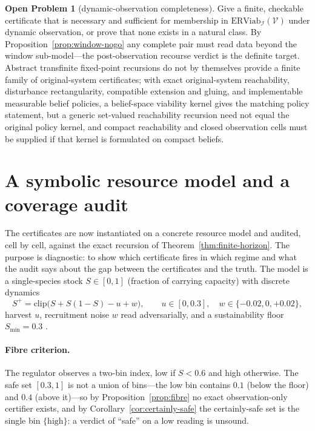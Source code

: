 \documentclass[11pt,a4paper]{article}
\theoremstyle{plain}
\theoremstyle{definition}
\newtheorem{openproblem}[theorem]{Open Problem}
\theoremstyle{remark}
\newcommand{\ERViab}{\mathrm{ERViab}}
\newcommand{\cV}{\mathcal{V}}
\newcommand{\cI}{\mathcal{I}}
\begin{document}
\begin{openproblem}[dynamic-observation completeness]\label{op:dynamic}
Give a finite, checkable certificate that is necessary and sufficient for membership in $\ERViab_\cI(\cV)$ under dynamic observation, or prove that none exists in a natural class. By Proposition~\ref{prop:window-nogo} any complete pair must read data beyond the window sub-model---the post-observation recourse verdict is the definite target. Abstract transfinite fixed-point recursions do not by themselves provide a finite family of original-system certificates; with exact original-system reachability, disturbance rectangularity, compatible extension and gluing, and implementable measurable belief policies, a belief-space viability kernel gives the matching policy statement, but a generic set-valued reachability recursion need not equal the original policy kernel, and compact reachability and closed observation cells must be supplied if that kernel is formulated on compact beliefs.
\end{openproblem}
\section{A symbolic resource model and a coverage audit}\label{sec:casestudy}

The certificates are now instantiated on a concrete resource model and audited, cell by cell, against the exact recursion of Theorem~\ref{thm:finite-horizon}. The purpose is diagnostic: to show which certificate fires in which regime and what the audit says about the gap between the certificates and the truth. The model is a single-species stock $S\in[0,1]$ (fraction of carrying capacity) with discrete dynamics
\[
S^+=\mathrm{clip}\bigl(S+S(1-S)-u+w\bigr),\qquad u\in[0,0.3],\quad w\in\{-0.02,0,+0.02\},
\]
harvest $u$, recruitment noise $w$ read adversarially, and a sustainability floor $S_{\min}=0.3$ \citep{clark1990}.

\paragraph{Fibre criterion.} The regulator observes a two-bin index, low if $S<0.6$ and high otherwise. The safe set $[0.3,1]$ is not a union of bins---the low bin contains $0.1$ (below the floor) and $0.4$ (above it)---so by Proposition~\ref{prop:fibre} no exact observation-only certifier exists, and by Corollary~\ref{cor:certainly-safe} the certainly-safe set is the single bin $\{\text{high}\}$: a verdict of ``safe'' on a low reading is unsound.
\end{document}
